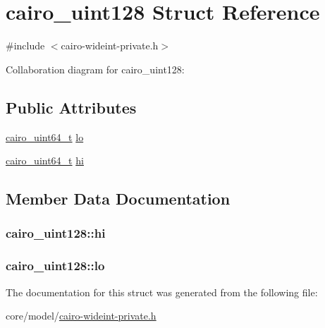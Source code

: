\hypertarget{structcairo__uint128}{}\section{cairo\+\_\+uint128 Struct Reference}
\label{structcairo__uint128}


{\ttfamily \#include $<$cairo-\/wideint-\/private.\+h$>$}



Collaboration diagram for cairo\+\_\+uint128\+:
\subsection*{Public Attributes}
\begin{DoxyCompactItemize}
\item 
\hyperlink{cairo-wideint-private_8h_addac97960d28a0f1b58a5abefd21b14b}{cairo\+\_\+uint64\+\_\+t} \hyperlink{structcairo__uint128_a650c4bfe3b578142940e3e4e872112e9}{lo}
\item 
\hyperlink{cairo-wideint-private_8h_addac97960d28a0f1b58a5abefd21b14b}{cairo\+\_\+uint64\+\_\+t} \hyperlink{structcairo__uint128_a86857a1c12a574ee089c60330ea0a86c}{hi}
\end{DoxyCompactItemize}


\subsection{Member Data Documentation}
\subsubsection[{\texorpdfstring{hi}{hi}}]{ cairo\+\_\+uint128\+::hi}\hypertarget{structcairo__uint128_a86857a1c12a574ee089c60330ea0a86c}{}\label{structcairo__uint128_a86857a1c12a574ee089c60330ea0a86c}
\subsubsection[{\texorpdfstring{lo}{lo}}]{ cairo\+\_\+uint128\+::lo}\hypertarget{structcairo__uint128_a650c4bfe3b578142940e3e4e872112e9}{}\label{structcairo__uint128_a650c4bfe3b578142940e3e4e872112e9}


The documentation for this struct was generated from the following file\+:\begin{DoxyCompactItemize}
\item 
core/model/\hyperlink{cairo-wideint-private_8h}{cairo-\/wideint-\/private.\+h}\end{DoxyCompactItemize}
